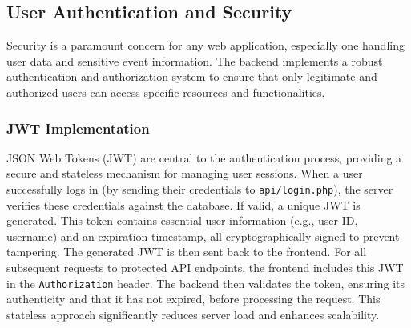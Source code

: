 \documentclass{report}
\begin{document}
\subsection{User Authentication and Security}
\label{sec:user_auth_security}
Security is a paramount concern for any web application, especially one handling user data and sensitive event information. The backend implements a robust authentication and authorization system to ensure that only legitimate and authorized users can access specific resources and functionalities.

\subsubsection{JWT Implementation}
\label{sec:jwt_implementation}
JSON Web Tokens (JWT) are central to the authentication process, providing a secure and stateless mechanism for managing user sessions. When a user successfully logs in (by sending their credentials to \texttt{api/login.php}), the server verifies these credentials against the database. If valid, a unique JWT is generated. This token contains essential user information (e.g., user ID, username) and an expiration timestamp, all cryptographically signed to prevent tampering. The generated JWT is then sent back to the frontend. For all subsequent requests to protected API endpoints, the frontend includes this JWT in the \texttt{Authorization} header. The backend then validates the token, ensuring its authenticity and that it has not expired, before processing the request. This stateless approach significantly reduces server load and enhances scalability.
\end{document}
